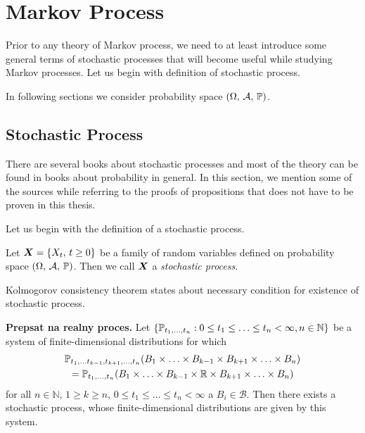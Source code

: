\chapter{Markov Process}

Prior to any theory of Markov process, we need to at least introduce some general terms of stochastic processes that will become useful while studying Markov processes. Let us begin with definition of stochastic process.

In following sections we consider probability space $(\Omega ,\, \mathcal{A} ,\, \operatorname{\mathbb{P}})$.


\section{Stochastic Process}
\label{chap:basics}

There are several books about stochastic processes and most of the theory can be found in books about probability in general. In this section, we mention some of the sources while referring to the proofs of propositions that does not have to be proven in this thesis.

Let us begin with the definition of a stochastic process.

\begin{definition}\label{stochProc}
	Let $\bm{X} = \{ X_t ,\, t \geq 0 \}$ be a family of random variables defined on probability space $(\Omega ,\, \mathcal{A} ,\, \operatorname{\mathbb{P}})$. Then we call $\bm{X}$ a \emph{stochastic process}.
\end{definition}

Kolmogorov consistency theorem states about necessary condition for existence of stochastic process.

\begin{theorem}\label{Kolmogorov} \textbf{\color{red} Prepsat na realny proces.}
  Let $\{\operatorname{\mathbb{P}}_{t_1, \ldots ,t_n}: 0\leq t_1\leq  \ldots  \leq t_n <\infty, n\in\mathbb{N} \}$ be a system of finite-dimensional distributions for which
	\begin{multline*}
		\operatorname{\mathbb{P}}_{t_1, \ldots t_{k-1},t_{k+1}, \ldots ,t_n}(B_1\times  \ldots \times B_{k-1} \times B_{k+1} \times  \ldots  \times B_n)\\
		= \operatorname{\mathbb{P}}_{t_1, \ldots ,t_n}(B_1\times \ldots \times B_{k-1} \times \mathbb{R} \times B_{k+1} \times  \ldots  \times B_n)
	\end{multline*}
	for all $n\in\mathbb{N}$, $1 \geq k \geq n$, $0\leq t_1\leq  \ldots  \leq t_n <\infty$ a $B_i \in \mathcal{B}$. Then there exists a stochastic process, whose finite-dimensional distributions are given by this system.
\end{theorem}

